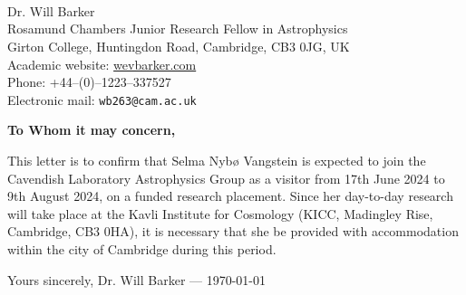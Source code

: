 \documentclass{article}
\begin{document}
\thispagestyle{empty}

\pagestyle{empty}


\vspace{90pt}

{\color{Gray}
\begin{minipage}{0.4\textwidth}
	 \\
	 \\
	 \\
	\phantom{a} 	
\end{minipage}
\begin{minipage}{0.6\textwidth}
	Dr. Will Barker \\
	Rosamund Chambers Junior Research Fellow in Astrophysics \\
	Girton College, Huntingdon Road, Cambridge, CB3 0JG, UK\\
	Academic website: \href{wevbarker.com}{wevbarker.com}\\
	Phone: +44--(0)--1223--337527\\
	Electronic mail: \texttt{wb263@cam.ac.uk}
\end{minipage}
}

\bigskip

\bigskip

\textbf{To Whom it may concern,}

\vspace{20pt}

This letter is to confirm that Selma Nybø Vangstein is expected to join the Cavendish Laboratory Astrophysics Group as a visitor from 17th June 2024 to 9th August 2024, on a funded research placement. Since her day-to-day research will take place at the Kavli Institute for Cosmology (KICC, Madingley Rise, Cambridge, CB3 0HA), it is necessary that she be provided with accommodation within the city of Cambridge during this period.

\vspace{20pt}

\vfill

Yours sincerely, \hfill Dr. Will Barker ---  \today
\end{document}
